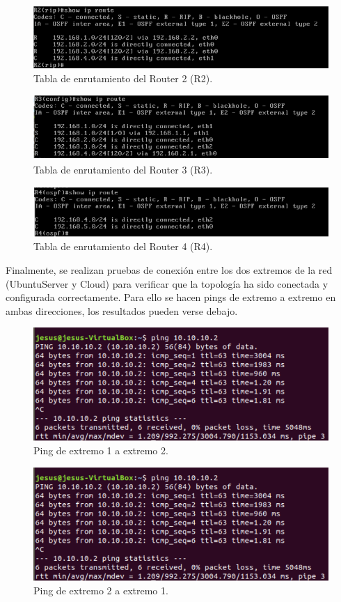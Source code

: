 \begin{figure}[htbp!]
	\centering
	\includegraphics[width=1\textwidth]{desarrollo/tarea1/img/T1_img2}
	\caption{Tabla de enrutamiento del Router 2 (R2).}
\end{figure}

\begin{figure}[htbp!]
	\centering
	\includegraphics[width=1\textwidth]{desarrollo/tarea1/img/T1_img3}
	\caption{Tabla de enrutamiento del Router 3 (R3).}
\end{figure}

\pagebreak
\begin{figure}[htbp!]
	\centering
	\includegraphics[width=1\textwidth]{desarrollo/tarea1/img/T1_img4}
	\caption{Tabla de enrutamiento del Router 4 (R4).}
\end{figure}

\noindent
Finalmente, se realizan pruebas de conexión entre los dos extremos de la red (UbuntuServer y Cloud) para verificar que la topología ha sido conectada y configurada correctamente. Para ello se hacen pings de extremo a extremo en ambas direcciones, los resultados pueden verse debajo. 

\begin{figure}[htbp!]
	\centering
	\includegraphics[width=1\textwidth]{desarrollo/tarea1/img/T1_img5}
	\caption{Ping de extremo 1 a extremo 2.}
\end{figure}

\begin{figure}[htbp!]
	\centering
	\includegraphics[width=1\textwidth]{desarrollo/tarea1/img/T1_img5}
	\caption{Ping de extremo 2 a extremo 1.}
\end{figure}